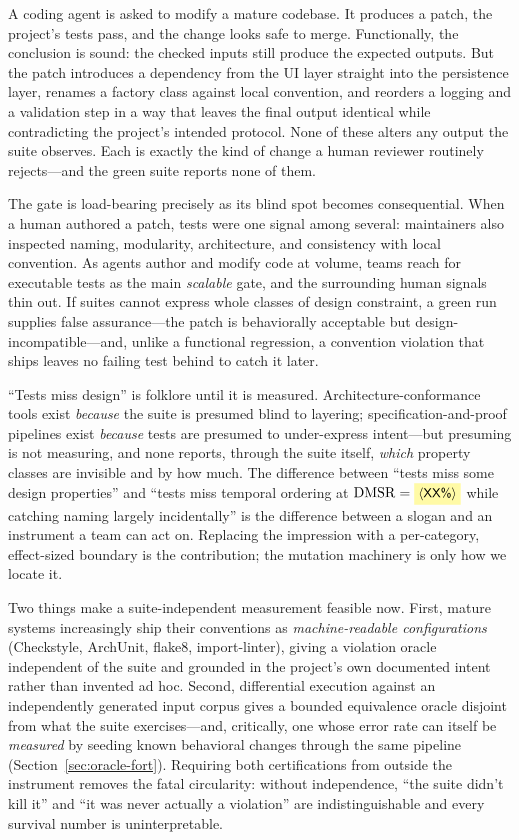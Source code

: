 \documentclass[conference]{IEEEtran}
\newcommand{\ph}[1]{\colorbox{yellow!35}{\small$\langle$\textsf{#1}$\rangle$}}
\newcommand{\dmsr}{\mathrm{DMSR}}
\begin{document}
A coding agent is asked to modify a mature codebase. It produces a patch, the project's tests pass, and the change looks safe to merge. Functionally, the conclusion is sound: the checked inputs still produce the expected outputs. But the patch introduces a dependency from the UI layer straight into the persistence layer, renames a factory class against local convention, and reorders a logging and a validation step in a way that leaves the final output identical while contradicting the project's intended protocol. None of these alters any output the suite observes. Each is exactly the kind of change a human reviewer routinely rejects---and the green suite reports none of them.

The gate is load-bearing precisely as its blind spot becomes consequential. When a human authored a patch, tests were one signal among several: maintainers also inspected naming, modularity, architecture, and consistency with local convention. As agents author and modify code at volume, teams reach for executable tests as the main \emph{scalable} gate, and the surrounding human signals thin out. If suites cannot express whole classes of design constraint, a green run supplies false assurance---the patch is behaviorally acceptable but design-incompatible---and, unlike a functional regression, a convention violation that ships leaves no failing test behind to catch it later.

``Tests miss design'' is folklore until it is measured. Architecture-conformance tools exist \emph{because} the suite is presumed blind to layering; specification-and-proof pipelines exist \emph{because} tests are presumed to under-express intent---but presuming is not measuring, and none reports, through the suite itself, \emph{which} property classes are invisible and by how much. The difference between ``tests miss some design properties'' and ``tests miss temporal ordering at $\dmsr = \ph{XX\%}$ while catching naming largely incidentally'' is the difference between a slogan and an instrument a team can act on. Replacing the impression with a per-category, effect-sized boundary is the contribution; the mutation machinery is only how we locate it.

Two things make a suite-independent measurement feasible now. First, mature systems increasingly ship their conventions as \emph{machine-readable configurations} (Checkstyle, ArchUnit, flake8, import-linter), giving a violation oracle independent of the suite and grounded in the project's own documented intent rather than invented ad hoc. Second, differential execution against an independently generated input corpus gives a bounded equivalence oracle disjoint from what the suite exercises---and, critically, one whose error rate can itself be \emph{measured} by seeding known behavioral changes through the same pipeline (Section~\ref{sec:oracle-fort}). Requiring both certifications from outside the instrument removes the fatal circularity: without independence, ``the suite didn't kill it'' and ``it was never actually a violation'' are indistinguishable and every survival number is uninterpretable.
\end{document}
